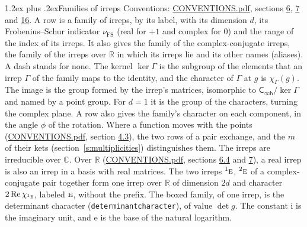 \documentclass[10pt,a4paper]{article}
\makeatletter
\renewcommand\section{\@startsection{section}{1}{\z@}{-3ex plus -1ex minus -.2ex}%
  {1.2ex plus .2ex}{\normalfont\large\sffamily\bfseries\color{parttitle}}}
\numberwithin{equation}{section}
\newcommand{\grp}[1]{\mathsf{#1}}
\newcommand{\irr}[1]{\text{\normalfont\scshape #1}}
\newcommand{\conjpair}[1]{{}^{#1}}
\newcommand{\iunit}{\mathrm{i}}
\newcommand{\expe}{\mathrm{e}}
\newcommand{\irchar}[1]{\chi_{#1}}
\newcommand{\fsind}{\nu_{\mathrm{FS}}}
\makeatother
\begin{document}
\section{Families of irreps}\label{s:families}
Conventions: \href{../../CONVENTIONS.pdf}{CONVENTIONS.pdf}, sections \href{../../CONVENTIONS.pdf\#conv.6}{6}, \href{../../CONVENTIONS.pdf\#conv.7}{7} and \href{../../CONVENTIONS.pdf\#conv.16}{16}.
\leavevmode\label{n:index.dimension}\label{n:index.frobenius}\label{n:index.family}\label{n:head.family.irreps}\label{n:head.index.family}A row is a family of irreps, by its label, with its dimension $d$, its Frobenius--Schur indicator $\fsind$ (real for $+1$ and complex for $0$) and the range of the index of its irreps. \label{n:head.conjugate}\label{n:head.over.real}\label{n:head.aliases}It also gives the family of the complex-conjugate irreps, the family of the irreps over $\mathbb{R}$ in which its irreps lie and its other names (aliases). A dash stands for none. \label{n:irrep.Gamma}\label{n:head.kernel}\label{n:function.character}The kernel $\ker\Gamma$ is the subgroup of the elements that an irrep $\Gamma$ of the family maps to the identity, and the character of $\Gamma$ at $g$ is $\irchar{\Gamma}(g)$. \label{n:head.image}The image is the group formed by the irrep's matrices, isomorphic to $\grp{C_{\infty h}}/\ker\Gamma$ and named by a point group. For $d = 1$ it is the group of the characters, turning the complex plane. A row also gives the family's character on each component, in the angle $\phi$ of the rotation. Where a function moves with the points (\href{../../CONVENTIONS.pdf}{CONVENTIONS.pdf}, section \href{../../CONVENTIONS.pdf\#conv.4.3}{4.3}), the two rows of a pair exchange, and the $m$ of their kets (section~\ref{s:multiplicities}) distinguishes them. The irreps are irreducible over $\mathbb{C}$. Over $\mathbb{R}$ (\href{../../CONVENTIONS.pdf}{CONVENTIONS.pdf}, sections \href{../../CONVENTIONS.pdf\#conv.6.4}{6.4} and \href{../../CONVENTIONS.pdf\#conv.7}{7}), a real irrep is also an irrep in a basis with real matrices. The two irreps $\conjpair{1}\irr{e}$, $\conjpair{2}\irr{e}$ of a complex-conjugate pair together form one irrep over $\mathbb{R}$ of dimension $2d$ and character $2\operatorname{Re}\irchar{\conjpair{1}\irr{e}}$, labeled $\irr{e}$, without the prefix. \label{n:mark.determinant}The boxed family, of one irrep, is the determinant character (\texttt{determinantcharacter}), of value $\det g$.
The constant $\iunit$ is the imaginary unit, and $\expe$ is the base of the natural logarithm.
\end{document}
